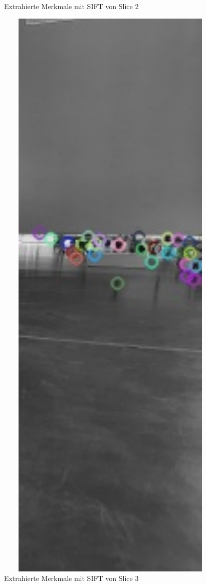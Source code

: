\begin{figure}[H]
\begin{minipage}[t]{0.22\linewidth}
  \caption{Extrahierte Merkmale mit SIFT von Slice 2}
  \label{fig:slice2-kp2}
  \end{minipage}
  \hfill
  \begin{minipage}[t]{0.22\linewidth}
  \includegraphics[width=1.0\textwidth]{img/piktogrammerkennung/slice3_kp2.jpg}
  \caption{Extrahierte Merkmale mit SIFT von Slice 3}
  \label{fig:slice3-kp2}
  \end{minipage}
\end{figure}


